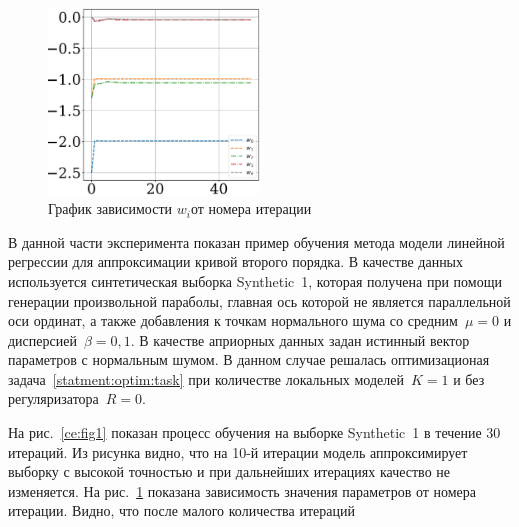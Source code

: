 \documentclass[12pt, twoside]{article}
\numberwithin{equation}{section}
\begin{document}
\begin{figure}[h!t]\center
\includegraphics[width=0.5\textwidth]{figures/511w}
\caption{График зависимости $w_i$от номера итерации}
\label{ce:fig2}
\end{figure}

В данной части эксперимента показан пример обучения метода модели линейной регрессии для аппроксимации кривой второго порядка. В качестве данных используется синтетическая выборка Synthetic~1, которая получена при помощи генерации произвольной параболы, главная ось которой не является параллельной оси ординат, а также добавления к точкам нормального шума со средним~$\mu=0$ и дисперсией~$\beta=0{,}1$. В качестве априорных данных задан истинный вектор параметров с нормальным шумом. В данном случае решалась оптимизационая задача~\eqref{statment:optim:task} при количестве локальных моделей~$K=1$ и без регуляризатора~$R=0$.

На рис.~\ref{ce:fig1} показан процесс обучения на выборке Synthetic~1 в течение 30 итераций. Из рисунка видно, что на 10-й итерации модель аппроксимирует выборку с высокой точностью и при дальнейших итерациях качество не изменяется. На рис.~\ref{ce:fig2} показана зависимость значения параметров от номера итерации. Видно, что после малого количества итераций 
\end{document}
